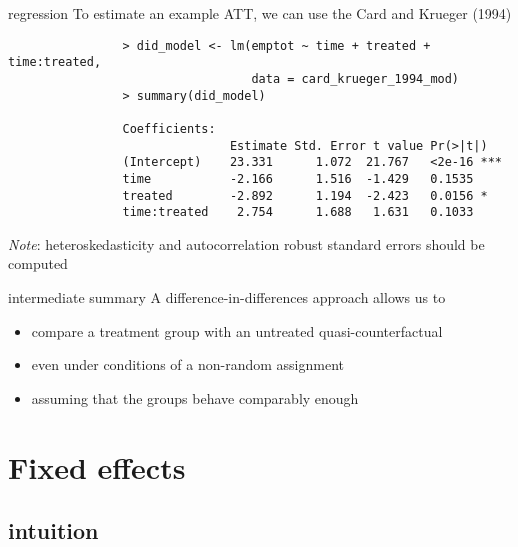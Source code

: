 \documentclass[aspectratio=169]{beamer}
\begin{document}
		\begin{frame}[fragile]{regression}
			To estimate an example ATT, we can use the Card and Krueger (1994) \href{http://economics.mit.edu/faculty/angrist/data1/mhe/card}{\underline{}}
 			\begin{verbatim}
				> did_model <- lm(emptot ~ time + treated + time:treated,
				                  data = card_krueger_1994_mod)
				> summary(did_model)

				Coefficients:
				               Estimate Std. Error t value Pr(>|t|)
				(Intercept)    23.331      1.072  21.767   <2e-16 ***
				time           -2.166      1.516  -1.429   0.1535
				treated        -2.892      1.194  -2.423   0.0156 *
				time:treated    2.754      1.688   1.631   0.1033
 	 		\end{verbatim}
			\vspace*{-.5cm}
			\footnotesize \textit{Note}: heteroskedasticity and autocorrelation robust standard errors should be computed
		\end{frame}

		\begin{frame}{intermediate summary}
			A difference-in-differences approach allows us to \\ \vspace*{.5cm}
			\begin{itemize}
				\item compare a treatment group with an untreated quasi-counterfactual
				\item even under conditions of a non-random assignment
				\item assuming that the groups behave comparably enough
			\end{itemize}
		\end{frame}

\section{Fixed effects}

	\subsection{intuition}
\end{document}
